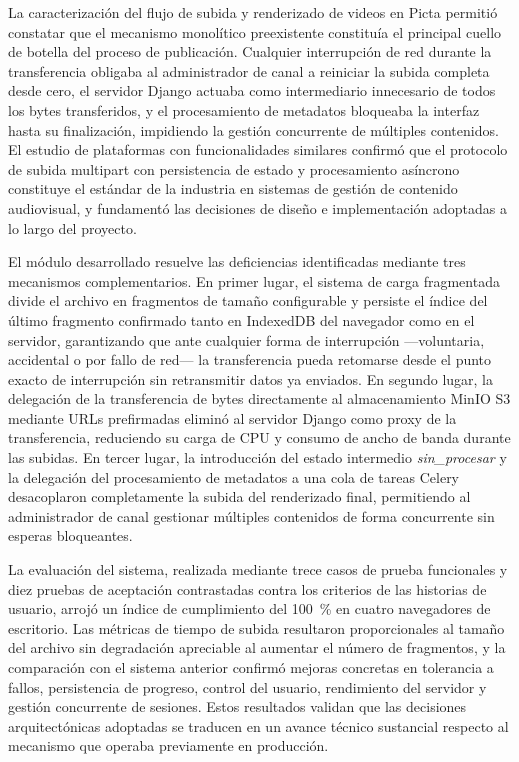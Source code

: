 \conclusions
 
La caracterización del flujo de subida y renderizado de videos en Picta permitió constatar que el
mecanismo monolítico preexistente constituía el principal cuello de botella del proceso de
publicación. Cualquier interrupción de red durante la transferencia obligaba al administrador de
canal a reiniciar la subida completa desde cero, el servidor Django actuaba como intermediario
innecesario de todos los bytes transferidos, y el procesamiento de metadatos bloqueaba la interfaz
hasta su finalización, impidiendo la gestión concurrente de múltiples contenidos. El estudio de
plataformas con funcionalidades similares confirmó que el protocolo de subida multipart con
persistencia de estado y procesamiento asíncrono constituye el estándar de la industria en sistemas
de gestión de contenido audiovisual, y fundamentó las decisiones de diseño e implementación
adoptadas a lo largo del proyecto.
 
El módulo desarrollado resuelve las deficiencias identificadas mediante tres mecanismos
complementarios. En primer lugar, el sistema de carga fragmentada divide el archivo en fragmentos
de tamaño configurable y persiste el índice del último fragmento confirmado tanto en IndexedDB del
navegador como en el servidor, garantizando que ante cualquier forma de interrupción ---voluntaria,
accidental o por fallo de red--- la transferencia pueda retomarse desde el punto exacto de
interrupción sin retransmitir datos ya enviados. En segundo lugar, la delegación de la transferencia
de bytes directamente al almacenamiento MinIO S3 mediante URLs prefirmadas eliminó al servidor
Django como proxy de la transferencia, reduciendo su carga de CPU y consumo de ancho de banda
durante las subidas. En tercer lugar, la introducción del estado intermedio \textit{sin\_procesar}
y la delegación del procesamiento de metadatos a una cola de tareas Celery desacoplaron
completamente la subida del renderizado final, permitiendo al administrador de canal gestionar
múltiples contenidos de forma concurrente sin esperas bloqueantes.
 
La evaluación del sistema, realizada mediante trece casos de prueba funcionales y diez pruebas de
aceptación contrastadas contra los criterios de las historias de usuario, arrojó un índice de
cumplimiento del 100~\% en cuatro navegadores de escritorio. Las métricas de tiempo de subida
resultaron proporcionales al tamaño del archivo sin degradación apreciable al aumentar el número de
fragmentos, y la comparación con el sistema anterior confirmó mejoras concretas en tolerancia a
fallos, persistencia de progreso, control del usuario, rendimiento del servidor y gestión
concurrente de sesiones. Estos resultados validan que las decisiones arquitectónicas adoptadas
se traducen en un avance técnico sustancial respecto al mecanismo que operaba previamente en
producción.